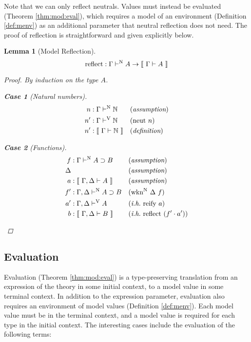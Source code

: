 \documentclass{llncs}
\newtheorem{sublemma}{Lemma}
\newtheorem{slcase}{Case}
\newcommand{\refdef}[1]{Definition \ref{def:#1}}
\newcommand{\refthm}[1]{Theorem \ref{thm:#1}}
\def\arr{\supset}
\def\marr{\rightarrow}
\def\nat{\mathbb{N}}
\def\bydef{(\textit{definition})}
\def\byass{(\textit{assumption})}
\newcommand{\ih}[1]{(\textit{i.h.}~ #1)}
\newcommand{\by}[1]{(#1)}
\newcommand{\turn}[1]{\vdash^\con{#1}}
\newcommand{\el}[1]{\llbracket ~ #1 ~ \rrbracket}
\newcommand{\wknn}[1]{\fun{wkn}^\con{N} ~ \Delta ~ #1}
\newcommand{\con}[1]{\textmd{#1}}
\newcommand{\fun}[1]{\textmd{#1}}
\newcommand{\typm}[1]{\el{\Gamma \vdash #1}}
\newcommand{\gdtypm}[1]{\el{\Gamma, \Delta \vdash #1}}
\newcommand{\typv}[1]{\Gamma \turn{V} #1}
\newcommand{\gdtypv}[1]{\Gamma, \Delta \turn{V} #1}
\newcommand{\typn}[1]{\Gamma \turn{N} #1}
\newcommand{\gdtypn}[1]{\Gamma, \Delta \turn{N} #1}
\begin{document}
Note that we can only reflect neutrals. Values must instead be
evaluated (\refthm{mod:eval}), which requires a model of an
environment (\refdef{menv}) as an additional parameter that neutral reflection does
not need. The proof of reflection is straightforward and given explicitly
below. 

\begin{sublemma}[Model Reflection]
\label{lem:mod:reflect}
$$
\fun{reflect} : \typn{A} \marr \typm{A}
$$

\begin{proof}

By induction on the type $A$.

\begin{slcase}[Natural numbers]
\begin{align*}
n  &: \typn{\nat} && \byass\\
n' &: \typv{\nat} && \by{\con{neut}~n}\\
n' &: \typm{\nat} && \bydef
\end{align*}
\end{slcase}

\begin{slcase}[Functions]
\begin{align*}
f &: \typn{A \arr B} && \byass\\
\Delta& && \byass\\
a  &: \gdtypm{A} && \byass\\
f' &: \gdtypn{A \arr B} && \by{\wknn{f}}\\
a' &: \gdtypv{A} && \ih{\fun{reify}~a}\\
b  &: \gdtypm{B} && \ih{\fun{reflect}~(f' \cdot a')}
\end{align*}
\end{slcase}

\end{proof}

\end{sublemma}

\subsection{Evaluation}

Evaluation (\refthm{mod:eval}) is a type-preserving translation from
an expression of the theory in some initial context, to a model value
in some terminal context. In addition to the expression parameter,
evaluation also requires an environment of model values
(\refdef{menv}). Each model value must be in the terminal context, and
a model value is required for each type in the initial context.
The interesting cases include the evaluation of the following terms:
\end{document}
